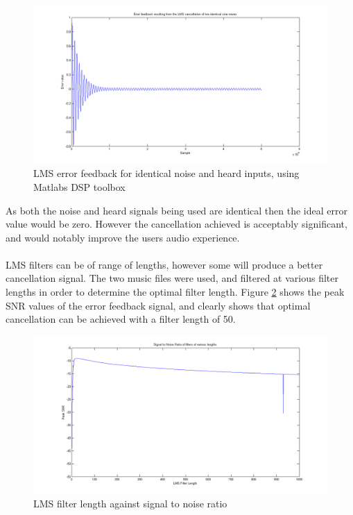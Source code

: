 \begin{figure}[H]
	\centering
	\includegraphics[width=\textwidth]{./img/lmssnr_cancel.png}
	\caption{LMS error feedback for identical noise and heard inputs, using Matlabs DSP toolbox}
	\label{fig:modellmscancel}
\end{figure}

\noindent As both the noise and heard signals being used are identical then the ideal error value would be zero.
However the cancellation achieved is acceptably significant, and would notably improve the users audio experience.
\\
\\
LMS filters can be of range of lengths, however some will produce a better cancellation signal.
The two music files were used, and filtered at various filter lengths in order to determine the optimal filter length.
Figure \ref{fig:modellmsfiltlen} shows the peak SNR values of the error feedback signal, and clearly shows that optimal cancellation can be achieved with a filter length of 50.

\begin{figure}[H]
	\centering
	\includegraphics[width=\textwidth]{./img/lmssnr_graph.png}
	\caption{LMS filter length against signal to noise ratio}
	\label{fig:modellmsfiltlen}
\end{figure}

